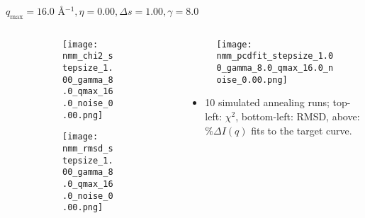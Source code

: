 \documentclass{beamer}
\begin{document}
\begin{frame}{$ q_{\textrm{max}}=16.0 $ \AA $^{-1}, \eta=0.00, \Delta s=1.00, \gamma=8.0$}
	\begin{columns}
		\begin{column}{.5\textwidth}
			\begin{figure}[H]
			\centering
			\begin{subfigure}[b]{\textwidth}
				\centering
				\texttt{[image: nmm\_chi2\_stepsize\_1.00\_gamma\_8.0\_qmax\_16.0\_noise\_0.00.png]}
				\label{fig:}
			\end{subfigure}
			\begin{subfigure}[b]{\textwidth}
				\centering
				\texttt{[image: nmm\_rmsd\_stepsize\_1.00\_gamma\_8.0\_qmax\_16.0\_noise\_0.00.png]}
				\label{fig:}
			\end{subfigure}
			\end{figure}
		\end{column}
		\begin{column}{.5\textwidth}
			\begin{figure}[H]
				\centering
				\texttt{[image: nmm\_pcdfit\_stepsize\_1.00\_gamma\_8.0\_qmax\_16.0\_noise\_0.00.png]}
				\label{fig:}
			\end{figure}
			\begin{itemize}
				\item 10 simulated annealing runs; top-left: $\chi^2$, bottom-left: RMSD, above: $\%\Delta I(q)$ fits to the target curve.
			\end{itemize}
		\end{column}
	\end{columns}
\end{frame}
 
\end{document}
